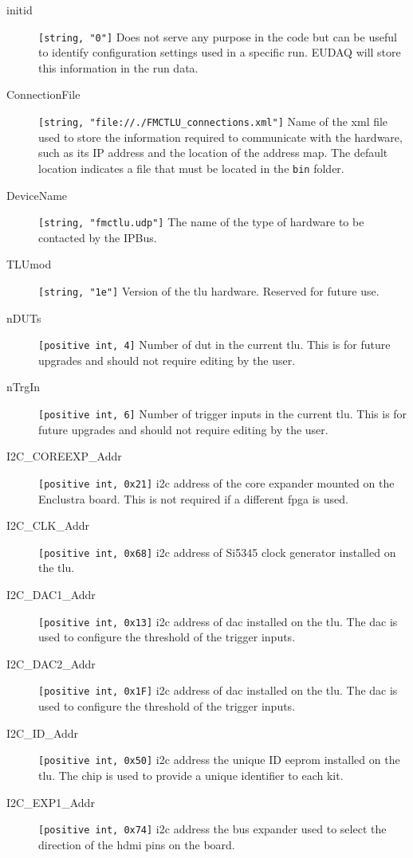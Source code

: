 \begin{description}
  \item[initid] \verb|[string, "0"]| Does not serve any purpose in the code but can be useful to identify configuration settings used in a specific run. EUDAQ will store this information in the run data.
  \item[ConnectionFile] \verb|[string, "file://./FMCTLU_connections.xml"]| Name of the xml file used to store the information required to communicate with the hardware, such as its IP address and the location of the address map. The default location indicates a file that must be located in the \texttt{bin} folder.
  \item[DeviceName] \verb|[string, "fmctlu.udp"]| The name of the type of hardware to be contacted by the IPBus.
  \item[TLUmod] \verb|[string, "1e"]| Version of the \gls{tlu} hardware. Reserved for future use.
  \item[nDUTs] \verb|[positive int, 4]| Number of \gls{dut} in the current \gls{tlu}. This is for future upgrades and should not require editing by the user.
  \item[nTrgIn] \verb|[positive int, 6]| Number of trigger inputs in the current \gls{tlu}. This is for future upgrades and should not require editing by the user.
  \item[I2C\_COREEXP\_Addr] \verb|[positive int, 0x21]| \gls{i2c} address of the core expander mounted on the Enclustra board. This is not required if a different \gls{fpga} is used.
  \item[I2C\_CLK\_Addr] \verb|[positive int, 0x68]| \gls{i2c} address of Si5345 clock generator installed on the \gls{tlu}.
  \item[I2C\_DAC1\_Addr] \verb|[positive int, 0x13]| \gls{i2c} address of \gls{dac} installed on the \gls{tlu}. The \gls{dac} is used to configure the threshold of the trigger inputs.
  \item[I2C\_DAC2\_Addr] \verb|[positive int, 0x1F]| \gls{i2c} address of \gls{dac} installed on the \gls{tlu}. The \gls{dac} is used to configure the threshold of the trigger inputs.
  \item[I2C\_ID\_Addr] \verb|[positive int, 0x50]| \gls{i2c} address the unique ID \gls{eeprom} installed on the \gls{tlu}. The chip is used to provide a unique identifier to each kit.
  \item[I2C\_EXP1\_Addr] \verb|[positive int, 0x74]| \gls{i2c} address the bus expander used to select the direction of the \gls{hdmi} pins on the board.

\end{description}
